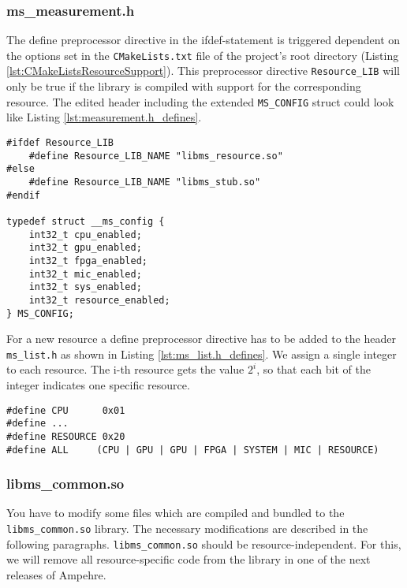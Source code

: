\subsubsection{ms\_measurement.h}
\label{sec:measurement_h}
 The define preprocessor directive in the ifdef-statement is triggered dependent on the options set in the \texttt{CMakeLists.txt} file of the project's root directory (Listing \ref{lst:CMakeListsResourceSupport}). This preprocessor directive \texttt{Resource\_LIB} will only be true if the library is compiled with support for the corresponding resource.  The edited header including the extended \texttt{MS\_CONFIG} struct could look like Listing \ref{lst:measurement.h_defines}.
\begin{lstlisting}[caption={Extended \texttt{ms\_measurement.h} header file with new define directives to support a new resource. \added[id=ck]{Listing angepasst}},label=lst:measurement.h_defines]		
#ifdef Resource_LIB
	#define Resource_LIB_NAME "libms_resource.so"
#else
	#define Resource_LIB_NAME "libms_stub.so"
#endif

typedef struct __ms_config {
	int32_t cpu_enabled;
	int32_t gpu_enabled;
	int32_t fpga_enabled;
	int32_t mic_enabled;
	int32_t sys_enabled;
	int32_t resource_enabled;
} MS_CONFIG;
\end{lstlisting}
For a new resource a define preprocessor directive has to be added to the header \texttt{ms\_list.h} as shown in Listing \ref{lst:ms_list.h_defines}. We assign a single integer to each resource. The i-th resource gets the value $2^{i}$, so that each bit of the integer indicates one specific resource.  
\begin{lstlisting}[caption={Extended \texttt{ms\_list.h} header.\added[id=ck]{Listing ist neu}},label=lst:ms_list.h_defines]
#define CPU		 0x01
#define ...
#define RESOURCE 0x20
#define ALL		(CPU | GPU | GPU | FPGA | SYSTEM | MIC | RESOURCE)
\end{lstlisting}

\subsubsection{libms\_common.so}
You have to modify some files which are compiled and bundled to the \\\texttt{libms\_common.so} library. The necessary modifications are described in the following paragraphs. \texttt{libms\_common.so} should be resource-independent. For this, we will remove all resource-specific code from the library in one of the next releases of Ampehre.

